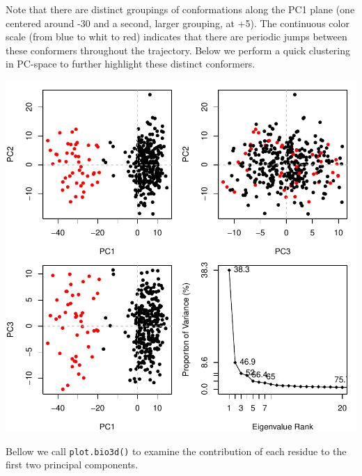 \documentclass[letter]{article}
\begin{document}
Note that there are distinct groupings of conformations along the PC1 plane (one centered around -30 and a second, larger grouping, at +5). The continuous color scale (from blue to whit to red) indicates that there are periodic jumps between these conformers throughout the trajectory. Below we perform a quick clustering in PC-space to further highlight these distinct conformers.
\begin{Schunk}
\end{Schunk}
\includegraphics{Bio3D_trajectory-013}

Bellow we call \texttt{plot.bio3d()} to examine the contribution of each residue to the first two principal components.
\end{document}

